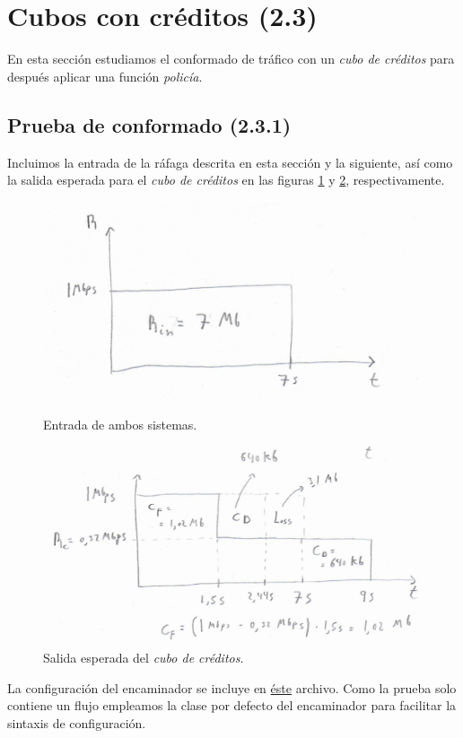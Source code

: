 \documentclass[11pt]{article}
\begin{document}
    \section{Cubos con créditos (2.3)}
        En esta sección estudiamos el conformado de tráfico con un \textit{cubo de créditos} para después aplicar una función \textit{policía}.

        \subsection{Prueba de conformado (2.3.1)}
            Incluimos la entrada de la ráfaga descrita en esta sección y la siguiente, así como la salida esperada para el \textit{cubo de créditos} en las figuras \ref{fig:inputBucks} y \ref{fig:outputBucks}, respectivamente.\\

            \begin{figure}
                \centering
                \includegraphics[width=0.6\linewidth]{tokenBucketsInput.png}
                \caption{Entrada de ambos sistemas.}
                \label{fig:inputBucks}
            \end{figure}

            \begin{figure}
                \centering
                \includegraphics[width=0.6\linewidth]{tokenBucketsOutput.png}
                \caption{Salida esperada del \textit{cubo de créditos}.}
                \label{fig:outputBucks}
            \end{figure}

            La configuración del encaminador se incluye en \href{https://github.com/UAH-s-Telematics-Engineering-Tasks/traff_eng/blob/master/P2/Router_confs/tokenBucket.cfg}{éste} archivo. Como la prueba solo contiene un flujo empleamos la clase por defecto del encaminador para facilitar la sintaxis de configuración.\\
\end{document}
